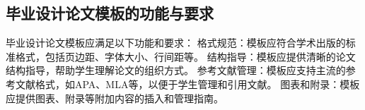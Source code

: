 \documentclass[../main.tex]{subfiles}
\begin{document}
\subsection{毕业设计论文模板的功能与要求}

毕业设计论文模板应满足以下功能和要求：\cite{tiotto_experiences_2024}
格式规范：模板应符合学术出版的标准格式，包括页边距、字体大小、行间距等。\cite{perez_user-driven_2023}
    结构指导：模板应提供清晰的论文结构指导，帮助学生理解论文的组织方式。\cite{hutchison_accull_2012}
    参考文献管理：模板应支持主流的参考文献格式，如APA、MLA等，以便于学生管理和引用文献。\cite{malawski_sycl-bench_2020}
    图表和附录：模板应提供图表、附录等附加内容的插入和管理指南。\cite{y_y_2014}
\end{document}

